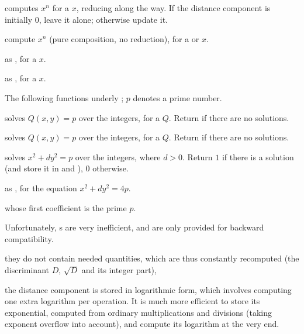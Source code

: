  computes $x^n$ for a  $x$, reducing
along the way. If the distance component is initially $0$, leave it alone;
otherwise update it.

 compute $x^n$ (pure composition, no
reduction), for a  or  $x$.

 as , for a  $x$.

 as , for a  $x$.


The following functions underly ; $p$ denotes a prime number.

 solves $Q(x,y) = p$ over the integers, for
a  $Q$. Return  if there are no solutions.

 solves $Q(x,y) = p$ over the integers, for
a  $Q$. Return  if there are no solutions.

 solves
$x^2+ dy^2 = p$ over the integers, where $d > 0$. Return $1$ if there is a
solution (and store it in  and ), $0$ otherwise.

 as ,
for the equation $x^2 + dy^2 = 4p$.


  whose first coefficient
is the prime $p$.


 Unfortunately, s
are very inefficient, and are only provided for backward compatibility.

\item they do not contain needed quantities, which are thus constantly
recomputed (the discriminant $D$, $\sqrt{D}$ and its integer part),

\item the distance component is stored in logarithmic form, which involves
computing one extra logarithm per operation. It is much more efficient
to store its exponential, computed from ordinary multiplications and
divisions (taking exponent overflow into account), and compute its logarithm
at the very end.

